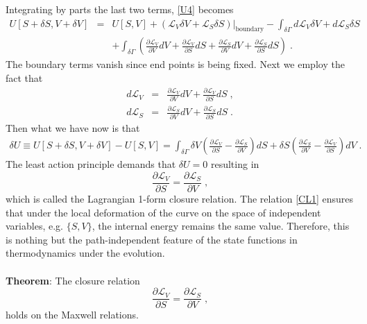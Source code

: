 \documentclass[12pt]{article}
\numberwithin{equation}{section}
\theoremstyle{remark}
\theoremstyle{definition}
\newcommand{\nn}{\nonumber}
\begin{document}
Integrating by parts the last two terms, \eqref{U4} becomes
\begin{eqnarray}
    U[S+\delta S,V+\delta V]&=& U[S,V]+\left(\mathcal{L}_V\delta V+\mathcal{L}_S\delta S\right)\Big\vert_{\text{boundary}}-\int_{\delta\Gamma}d\mathcal{L}_V\delta V+d\mathcal{L}_S\delta S\nn\\  &&+\int_{\delta\Gamma}\left(\frac{\partial\mathcal{L}_V}{\partial V}dV+\frac{\partial\mathcal{L}_V}{\partial S}dS+\frac{\partial\mathcal{L}_S}{\partial V}dV+\frac{\partial\mathcal{L}_S}{\partial S}dS\right)\;.
\end{eqnarray}
The boundary terms vanish since end points is being fixed. Next we employ the fact that
\begin{eqnarray}
    d\mathcal{L}_V&=&\frac{\partial \mathcal{L}_V}{\partial V}dV+\frac{\partial \mathcal{L}_V}{\partial S}dS\;,\\
     d\mathcal{L}_S&=&\frac{\partial \mathcal{L}_S}{\partial V}dV+\frac{\partial \mathcal{L}_S}{\partial S}dS\;.
\end{eqnarray}
Then what we have now is that
\begin{eqnarray}
    \delta U\equiv U[S+\delta S,V+\delta V]-U[S,V]=\int_{\delta\Gamma}\delta V\left(\frac{\partial\mathcal{L}_V}{\partial S}-\frac{\partial\mathcal{L}_S}{\partial V}\right)dS+\delta S\left(\frac{\partial\mathcal{L}_S}{\partial V}-\frac{\partial\mathcal{L}_V}{\partial S}\right)dV\;.
\end{eqnarray}
The least action principle demands that $\delta U=0$ resulting in
\begin{equation}\label{CL1}
    \frac{\partial\mathcal{L}_V}{\partial S}=\frac{\partial\mathcal{L}_S}{\partial V}\;,
\end{equation}
which is called the Lagrangian 1-form closure relation. The relation \eqref{CL1} ensures that under the local deformation of the curve on the space of independent variables, e.g. $\{S,V\}$, the internal energy remains the same value. Therefore, this is nothing but the path-independent feature of the state functions in thermodynamics under the evolution.
\\
\\
\textbf{Theorem}: The closure relation 
\begin{equation}
    \frac{\partial\mathcal{L}_V}{\partial S}=\frac{\partial\mathcal{L}_S}{\partial V}\;,\nn
\end{equation}
holds on the Maxwell relations.
\\
\\
\end{document}
